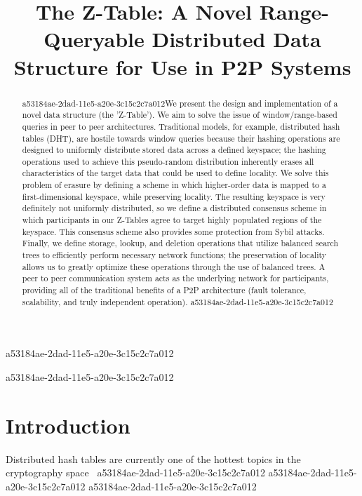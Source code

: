 \documentclass[12pt]{article}
\title{The Z-Table: A Novel Range-Queryable Distributed Data Structure for Use in P2P Systems}
\begin{document}
\maketitle

a53184ae-2dad-11e5-a20e-3c15c2c7a012\begin{abstract}
a53184ae-2dad-11e5-a20e-3c15c2c7a012We present the design and implementation of a novel data structure (the 'Z-Table'). We aim to solve the issue of window/range-based queries in peer to peer architectures. Traditional models, for example,  distributed hash tables (DHT), are hostile towards window queries because their hashing operations are designed to uniformly distribute stored data across a defined keyspace; the hashing operations used to achieve this pseudo-random distribution inherently erases all characteristics of the target data that could be used to define locality. We solve this problem of erasure by defining a scheme in which higher-order data is mapped to a first-dimensional keyspace, while preserving locality. The resulting keyspace is very definitely not uniformly distributed, so we define a distributed consensus scheme in which participants in our Z-Tables agree to target highly populated regions of the keyspace. This consensus scheme also provides some protection from Sybil attacks. Finally, we define storage, lookup, and deletion operations that utilize balanced search trees to efficiently perform necessary network functions; the preservation of locality allows us to greatly optimize these operations through the use of balanced trees. A peer to peer communication system acts as the underlying network for participants, providing all of the traditional benefits of a P2P architecture (fault tolerance, scalability, and truly independent operation).
a53184ae-2dad-11e5-a20e-3c15c2c7a012\end{abstract}
a53184ae-2dad-11e5-a20e-3c15c2c7a012

\newpage
\section{Introduction}
Distributed hash tables are currently one of the hottest topics in the cryptography space~\cite{Stoica:2001dj,Rowstron:2001ea,Ratnasamy:2001wn}
a53184ae-2dad-11e5-a20e-3c15c2c7a012
a53184ae-2dad-11e5-a20e-3c15c2c7a012\printbibliography
a53184ae-2dad-11e5-a20e-3c15c2c7a012
\end{document}
